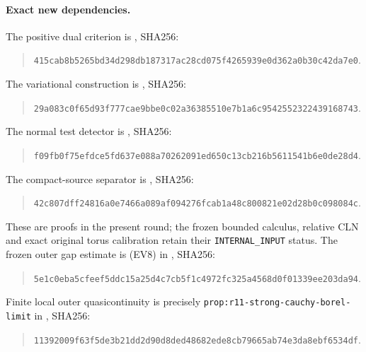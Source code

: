 \paragraph{Exact new dependencies.}
The positive dual criterion is
, SHA256:
\begin{quote}\small
\nolinkurl{415cab8b5265bd34d298db187317ac28cd075f4265939e0d362a0b30c42da7e0}.
\end{quote}
The variational construction is
, SHA256:
\begin{quote}\small
\nolinkurl{29a083c0f65d93f777cae9bbe0c02a36385510e7b1a6c9542552322439168743}.
\end{quote}
The normal test detector is
, SHA256:
\begin{quote}\small
\nolinkurl{f09fb0f75efdce5fd637e088a70262091ed650c13cb216b5611541b6e0de28d4}.
\end{quote}
The compact-source separator is
, SHA256:
\begin{quote}\small
\nolinkurl{42c807dff24816a0e7466a089af094276fcab1a48c800821e02d28b0c098084c}.
\end{quote}
These are proofs in the present round; the frozen bounded calculus,
relative CLN and exact original torus calibration retain their
\texttt{INTERNAL\_INPUT} status.
The frozen outer gap estimate is (EV8) in
,
SHA256:
\begin{quote}\small
\nolinkurl{5e1c0eba5cfeef5ddc15a25d4c7cb5f1c4972fc325a4568d0f01339ee203da94}.
\end{quote}
Finite local outer quasicontinuity is precisely
\texttt{prop:r11-strong-cauchy-borel-limit} in
,
SHA256:
\begin{quote}\small
\nolinkurl{11392009f63f5de3b21dd2d90d8ded48682ede8cb79665ab74e3da8ebf6534df}.
\end{quote}
